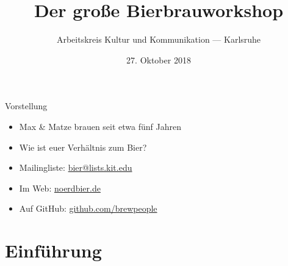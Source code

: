 \documentclass[9pt, ngerman]{beamer}
\title{Der große Bierbrauworkshop}
\author{Arbeitskreis Kultur und Kommunikation --- Karlsruhe}
\date{27. Oktober 2018}
\begin{document}
\maketitle


\begin{frame}{Vorstellung}
  \begin{itemize}
    \item Max \& Matze brauen seit etwa fünf Jahren
    \item Wie ist euer Verhältnis zum Bier?
  \end{itemize}

  \begin{itemize}
    \item Mailingliste: \href{mailto:bier@lists.kit.edu}{bier@lists.kit.edu}
    \item Im Web: \href{http://noerdbier.de}{noerdbier.de}
    \item Auf GitHub: \href{https://gtihub.com/brewpeople}{github.com/brewpeople}
  \end{itemize}
\end{frame}

\section{Einführung}
\end{document}
